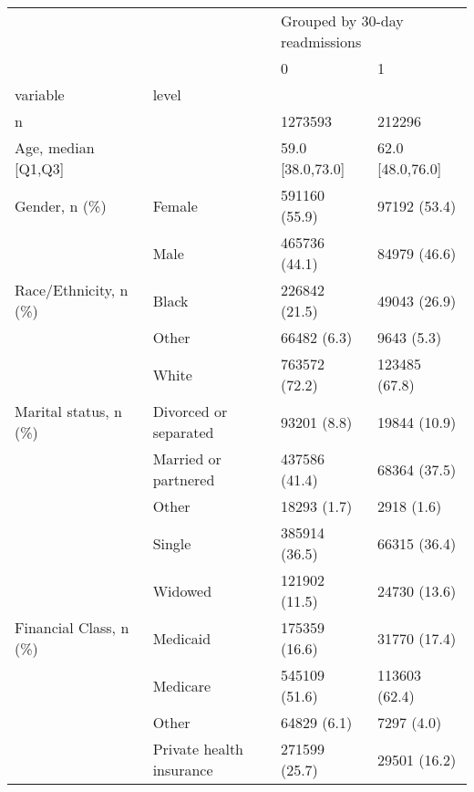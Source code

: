 \begin{tabular}{llll}
\toprule
                                       &   & \multicolumn{2}{l}{Grouped by 30-day readmissions} \\
                                       &   &                              0 &                  1 \\
variable & level &                                &                    \\
\midrule
n &   &                        1273593 &             212296 \\
Age, median [Q1,Q3] &   &               59.0 [38.0,73.0] &   62.0 [48.0,76.0] \\
Gender, n (\%) & Female &                  591160 (55.9) &       97192 (53.4) \\
                                       & Male &                  465736 (44.1) &       84979 (46.6) \\
Race/Ethnicity, n (\%) & Black &                  226842 (21.5) &       49043 (26.9) \\
                                       & Other &                    66482 (6.3) &         9643 (5.3) \\
                                       & White &                  763572 (72.2) &      123485 (67.8) \\
Marital status, n (\%) & Divorced or separated &                    93201 (8.8) &       19844 (10.9) \\
                                       & Married or partnered &                  437586 (41.4) &       68364 (37.5) \\
                                       & Other &                    18293 (1.7) &         2918 (1.6) \\
                                       & Single &                  385914 (36.5) &       66315 (36.4) \\
                                       & Widowed &                  121902 (11.5) &       24730 (13.6) \\
Financial Class, n (\%) & Medicaid &                  175359 (16.6) &       31770 (17.4) \\
                                       & Medicare &                  545109 (51.6) &      113603 (62.4) \\
                                       & Other &                    64829 (6.1) &         7297 (4.0) \\
                                       & Private health insurance &                  271599 (25.7) &       29501 (16.2) \\

\end{tabular}
